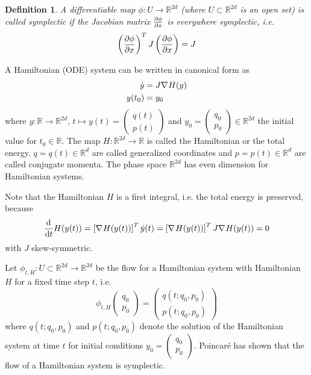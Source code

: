 \documentclass[twoside,a4paper]{article}
\newtheorem{definition}{Definition}
\begin{document}
\begin{definition}
	A differentiable map $\phi : U \to \mathbb{R}^{2d}$ (where $U \subset \mathbb{R}^{2d}$ is an open set)
	is called symplectic if the Jacobian matrix $\frac{\partial \phi}{\partial x}$ is everywhere symplectic, i.e.
	\begin{equation*}
		\left( \frac{\partial \phi}{\partial x} \right)^T J \left( \frac{\partial \phi}{\partial x} \right) = J
	\end{equation*}
\end{definition}

A Hamiltonian (ODE) system can be written in canonical form as
\begin{align*}
	\dot{y} &= J \nabla_{}{H}(y) \\
	y(t_0) &= y_0
\end{align*}
where $y: \mathbb{R} \to \mathbb{R}^{2d},\, t \mapsto y(t) = \begin{pmatrix}
	q(t) \\
	p(t)
\end{pmatrix}$ and $y_0 = \begin{pmatrix}
	q_0 \\
	p_0
\end{pmatrix} \in \mathbb{R}^{2d}$ the initial value for $t_0 \in \mathbb{R}$. 
The map $H: \mathbb{R}^{2d} \to \mathbb{R}$ is called the Hamiltonian 
or the total energy. $q = q(t) \in \mathbb{R}^d$ are called generalized coordinates
and $p=p(t) \in \mathbb{R}^d$ are called conjugate momenta. 
The phase space $\mathbb{R}^{2d}$ has even dimension for Hamiltonian systems.

Note that the Hamiltonian $H$ is a first integral, i.e. the total energy is preserved, because
\begin{equation*}
	\frac{\mathrm{d}^{}}{\mathrm{d}t} H(y(t)) = \left[ \nabla_{}{H}(y(t)) \right]^T \dot{y}(t) = 
	\left[ \nabla_{}{H}(y(t)) \right]^T J \nabla_{}{H}(y(t)) = 0
\end{equation*}
with $J$ skew-symmetric.

Let $\phi_{t,H} : U \subset \mathbb{R}^{2d} \to \mathbb{R}^{2d}$ be the flow for a Hamiltonian system 
with Hamiltonian $H$ for a fixed time step $t$, i.e.
\begin{equation*}
	\phi_{t,H}\begin{pmatrix}
		q_0 \\
		p_0
	\end{pmatrix}
	= \begin{pmatrix}
		q(t; q_0, p_0) \\
		p(t; q_0, p_0)
	\end{pmatrix}
\end{equation*}
where $q(t; q_0, p_0)$ and $p(t; q_0, p_0)$ denote the solution of the Hamiltonian system
at time $t$ for initial conditions $y_0 = \begin{pmatrix}
	q_0 \\
	p_0
\end{pmatrix}$. Poincaré has shown that the flow of a Hamiltonian system is symplectic.
\end{document}
